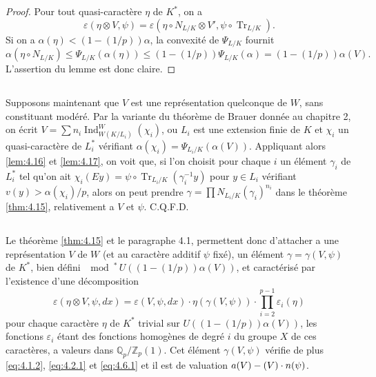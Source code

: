 \documentclass[12pt,a4paper]{article}
\theoremstyle{plain}
\theoremstyle{definition}
\theoremstyle{remark}
\DeclareMathOperator{\Ind}{Ind}
\DeclareMathOperator{\Tr}{Tr}
\newcommand{\bQ}{\mathbb{Q}}
\newcommand{\bZ}{\mathbb{Z}}
\let\dim\relax\let\det\relax
\providecommand{\Tr}{\operatorname{Tr}}
\begin{document}
\begin{proof}
Pour tout quasi-caract\`ere $\eta$ de $K^*$, on a
\[
\varepsilon(\eta \otimes V, \psi) = \varepsilon(\eta \circ N_{L/K} \otimes V', \psi \circ \Tr_{L/K}).
\]
Si on a $\alpha(\eta) < (1-(1/p))\alpha$, la convexit\'e de $\Psi_{L/K}$ fournit
\[
\alpha(\eta \circ N_{L/K}) \leq \Psi_{L/K}(\alpha(\eta)) \leq (1-(1/p)) \Psi_{L/K}(\alpha) = (1-(1/p)) \alpha(V).
\]
L'assertion du lemme est donc claire.
\end{proof}

\subsection{}
\label{sec:4.18}

Supposons maintenant que $V$ est une repr\'esentation quelconque de $W$, sans constituant mod\'er\'e. Par la variante du th\'eor\`eme de Brauer donn\'ee au chapitre 2, on \'ecrit $V = \sum n_i \Ind_{W(K/L_i)}^W(\chi_i)$, ou $L_i$ est une extension finie de $K$ et $\chi_i$ un quasi-caract\`ere de $L_i^*$ v\'erifiant $\alpha(\chi_i) = \Psi_{L_i/K}(\alpha(V))$. Appliquant alors \ref{lem:4.16} et \ref{lem:4.17}, on voit que, si l'on choisit pour chaque $i$ un \'el\'ement $\gamma_i$ de $L_i^*$ tel qu'on ait $\chi_i(Ey) = \psi \circ \Tr_{L_i/K}(\gamma_i^{-1} y)$ pour $y \in L_i$ v\'erifiant $v(y) > \alpha(\chi_i)/p$, alors on peut prendre $\gamma = \prod N_{L_i/K}(\gamma_i)^{n_i}$ dans le th\'eor\`eme \ref{thm:4.15}, relativement a $V$ et $\psi$. C.Q.F.D.

\subsection{}
\label{sec:4.19}

Le th\'eor\`eme \ref{thm:4.15} et le paragraphe 4.1, permettent donc d'attacher a une repr\'esentation $V$ de $W$ (et au caract\`ere additif $\psi$ fix\'e), un \'el\'ement $\gamma = \gamma(V, \psi)$ de $K^*$, bien d\'efini $\mod^*\, U((1-(1/p))\alpha(V))$, et caract\'eris\'e par l'existence d'une d\'ecomposition
\begin{equation}\label{eq:4.19.1}
\varepsilon(\eta \otimes V, \psi, dx) = \varepsilon(V, \psi, dx) \cdot \eta(\gamma(V, \psi)) \cdot \prod_{i=2}^{p-1} \varepsilon_i(\eta)
\end{equation}
pour chaque caract\`ere $\eta$ de $K^*$ trivial sur $U((1-(1/p))\alpha(V))$, les fonctions $\varepsilon_i$ \'etant des fonctions homog\`enes de degr\'e $i$ du groupe $X$ de ces caract\`eres, a valeurs dans $\bQ_p/\bZ_p(1)$. Cet \'el\'ement $\gamma(V, \psi)$ v\'erifie de plus \eqref{eq:4.1.2}, \eqref{eq:4.2.1} et \eqref{eq:4.6.1} et il est de valuation $a(V) - (\dim V) \cdot n(\psi)$.
\end{document}
